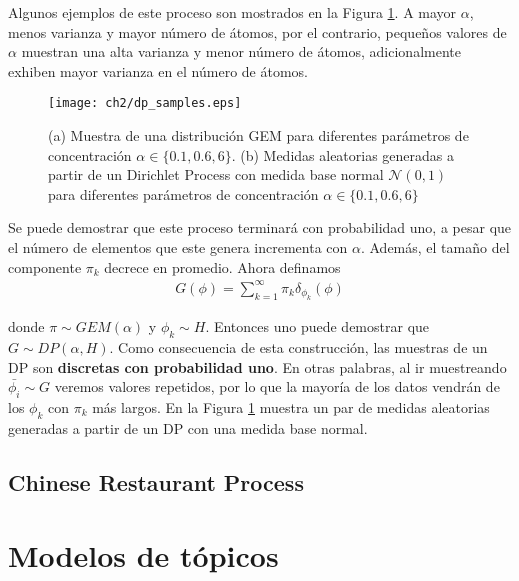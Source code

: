 \documentclass[letterpaper,12pt,oneside]{book} %
\begin{document}
Algunos ejemplos de este proceso son mostrados en la Figura \ref{img:dp_samples}. A mayor $\alpha$, menos varianza y mayor número de átomos, por el contrario, pequeños valores de $\alpha$ muestran una alta varianza y menor número de átomos, adicionalmente exhiben mayor varianza en el número de átomos.

\begin{figure}
    \centering
    \texttt{[image: ch2/dp\_samples.eps]}
    \caption{(a) Muestra de una distribución GEM para diferentes parámetros de concentración $\alpha\in \{0.1, 0.6, 6\}$. (b) Medidas aleatorias generadas a partir de un Dirichlet Process con medida base normal $\mathcal{N}(0,1)$ para diferentes parámetros de concentración $\alpha\in \{0.1, 0.6, 6\}$}
    \label{img:dp_samples}
\end{figure}

Se puede demostrar que este proceso terminará con probabilidad uno, a pesar que el número de elementos que este genera incrementa con $\alpha$. Además, el tamaño del componente $\pi_{k}$ decrece en promedio. Ahora definamos 
\begin{align}
    G(\phi) = \sum_{k=1}^{\infty}\pi_{k}\delta_{\phi_{k}}(\phi)
\end{align}

donde $\pi \sim GEM(\alpha)$ y $\phi_{k} \sim H$. Entonces uno puede demostrar que $G \sim DP(\alpha, H)$. Como consecuencia de esta construcción, las muestras de un DP son \textbf{discretas con probabilidad uno}. En otras palabras, al ir muestreando $\bar{\phi_{i}}\sim G$ veremos valores repetidos, por lo que la mayoría de los datos vendrán de los $\phi_{k}$ con $\pi_{k}$ más largos. En la Figura \ref{img:dp_samples} muestra un par de medidas aleatorias generadas a partir de un DP con una medida base normal.\\


\subsection{Chinese Restaurant Process}
\label{sec:crp}


\section{Modelos de tópicos}

\end{document}
